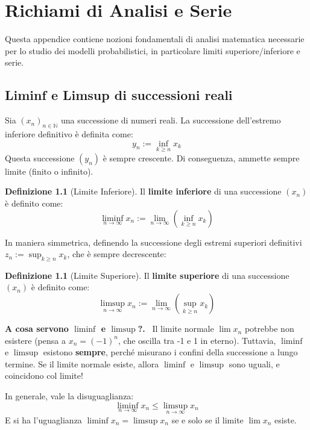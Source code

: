 \documentclass[11pt, a4paper]{report}
\theoremstyle{plain}
\theoremstyle{definition}
\newtheorem{definition}[theorem]{Definizione}
\theoremstyle{remark}
\newenvironment{spiegazione}[1][Spiegazione]
{\begin{mdframed}[backgroundcolor=green!5, linecolor=green!50, linewidth=2pt, topline=false, rightline=false, bottomline=false]
\textbf{\textsf{#1.}}\ }
{\end{mdframed}}
\newcommand{\N}{\mathbb{N}}
\newcommand{\1}{\mathbf{1}}
\begin{document}
\appendix
\chapter{Richiami di Analisi e Serie}

Questa appendice contiene nozioni fondamentali di analisi matematica necessarie per lo studio dei modelli probabilistici, in particolare limiti superiore/inferiore e serie.

\section{Liminf e Limsup di successioni reali}

Sia $(x_n)_{n \in \N}$ una successione di numeri reali. 
La successione dell'estremo inferiore definitivo è definita come:
\[ y_n := \inf_{k \ge n} x_k \]
Questa successione $(y_n)$ è sempre crescente. Di conseguenza, ammette sempre limite (finito o infinito).

\begin{definition}[Limite Inferiore]
Il \textbf{limite inferiore} di una successione $(x_n)$ è definito come:
\[ \liminf_{n \to \infty} x_n := \lim_{n \to \infty} \left( \inf_{k \ge n} x_k \right) \]
\end{definition}

In maniera simmetrica, definendo la successione degli estremi superiori definitivi $z_n := \sup_{k \ge n} x_k$, che è sempre decrescente:

\begin{definition}[Limite Superiore]
Il \textbf{limite superiore} di una successione $(x_n)$ è definito come:
\[ \limsup_{n \to \infty} x_n := \lim_{n \to \infty} \left( \sup_{k \ge n} x_k \right) \]
\end{definition}

\begin{spiegazione}[A cosa servono $\liminf$ e $\limsup$?]
Il limite normale $\lim x_n$ potrebbe non esistere (pensa a $x_n = (-1)^n$, che oscilla tra -1 e 1 in eterno). Tuttavia, $\liminf$ e $\limsup$ esistono \textbf{sempre}, perché misurano i confini della successione a lungo termine. 
Se il limite normale esiste, allora $\liminf$ e $\limsup$ sono uguali, e coincidono col limite!
\end{spiegazione}

In generale, vale la disuguaglianza:
\[ \liminf_{n \to \infty} x_n \le \limsup_{n \to \infty} x_n \]
E si ha l'uguaglianza $\liminf x_n = \limsup x_n$ se e solo se il limite $\lim x_n$ esiste.
\end{document}
